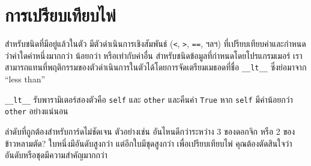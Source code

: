 \section{การเปรียบเทียบไพ่} %
\label{comparecard}


สำหรับชนิดที่มีอยู่แล้วในตัว มีตัวดำเนินการเชิงสัมพันธ์ ({\tt <}, {\tt >}, {\tt ==}, ฯลฯ) ที่เปรียบเทียบค่าและกำหนดว่าค่าใดค่าหนึ่งมากกว่า น้อยกว่า หรือเท่ากับค่าอื่น
สำหรับชนิดข้อมูลที่กำหนดโดยโปรแกรมเมอร์ เราสามารถแทนที่พฤติกรรมของตัวดำเนินการในตัวได้โดยการจัดเตรียมเมธอดที่ชื่อ \verb"__lt__" ซึ่งย่อมาจาก ``less than''


\verb"__lt__" รับพารามิเตอร์สองตัวคือ {\tt self} และ {\tt other} และคืนค่า {\tt True} หาก {\tt self} มีค่าน้อยกว่า {\tt other} อย่างแน่นอน



ลำดับที่ถูกต้องสำหรับการ์ดไม่ชัดเจน ตัวอย่างเช่น อันไหนดีกว่าระหว่าง 3 ของดอกจิก หรือ 2 ของข้าวหลามตัด? 
ใบหนึ่งมีอันดับสูงกว่า แต่อีกใบมีชุดสูงกว่า เพื่อเปรียบเทียบไพ่ คุณต้องตัดสินใจว่าอันดับหรือชุดมีความสำคัญมากกว่า



